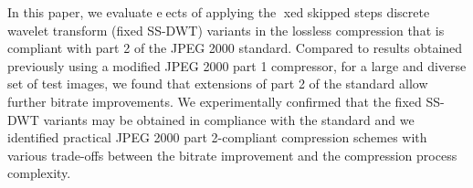 In this paper, we evaluate eects of applying the xed skipped
steps discrete wavelet transform (fixed SS-DWT) variants in the lossless
compression that is compliant with part 2 of the JPEG 2000 standard.
Compared to results obtained previously using a modified JPEG 2000
part 1 compressor, for a large and diverse set of test images, we found that
extensions of part 2 of the standard allow further bitrate improvements.
We experimentally confirmed that the fixed SS-DWT variants may be obtained
in compliance with the standard and we identified practical JPEG
2000 part 2-compliant compression schemes with various trade-offs between
the bitrate improvement and the compression process complexity. \cite{practical_dwt} 
